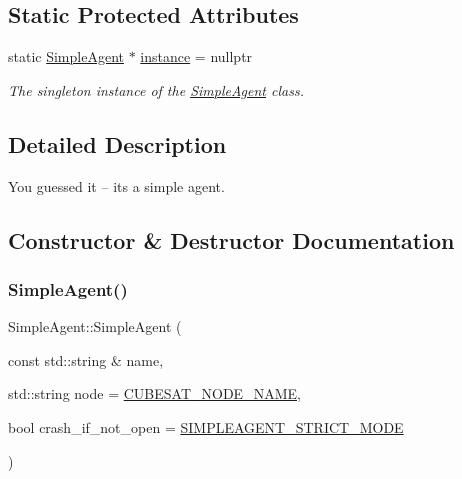 \subsection*{Static Protected Attributes}
\begin{DoxyCompactItemize}
\item 
static \hyperlink{classcubesat_1_1SimpleAgent}{Simple\+Agent} $\ast$ \hyperlink{classcubesat_1_1SimpleAgent_afce483d51ae5166a7eafb5cedf5e384a}{instance} = nullptr
\begin{DoxyCompactList}\small\item\em The singleton instance of the \hyperlink{classcubesat_1_1SimpleAgent}{Simple\+Agent} class. \end{DoxyCompactList}\end{DoxyCompactItemize}


\subsection{Detailed Description}
You guessed it -- it\textquotesingle{}s a simple agent. 

\subsection{Constructor \& Destructor Documentation}
\mbox{\label{classcubesat_1_1SimpleAgent_a3ebec0e4954f90ecc14c0f964868ce4f}} 
\subsubsection{\texorpdfstring{Simple\+Agent()}{SimpleAgent()}\hspace{0.1cm}{\footnotesize\ttfamily [1/2]}}
{\footnotesize\ttfamily Simple\+Agent\+::\+Simple\+Agent (\begin{DoxyParamCaption}\item[{const std\+::string \&}]{name,  }\item[{std\+::string}]{node = {\ttfamily \hyperlink{cubesat__defs_8h_adce46043c3a8fc68eaee12044efd08e2}{C\+U\+B\+E\+S\+A\+T\+\_\+\+N\+O\+D\+E\+\_\+\+N\+A\+ME}},  }\item[{bool}]{crash\+\_\+if\+\_\+not\+\_\+open = {\ttfamily \hyperlink{SimpleAgent_8h_ae0458b189260d62b7f199e0324dc3cc4}{S\+I\+M\+P\+L\+E\+A\+G\+E\+N\+T\+\_\+\+S\+T\+R\+I\+C\+T\+\_\+\+M\+O\+DE}} }\end{DoxyParamCaption})}



